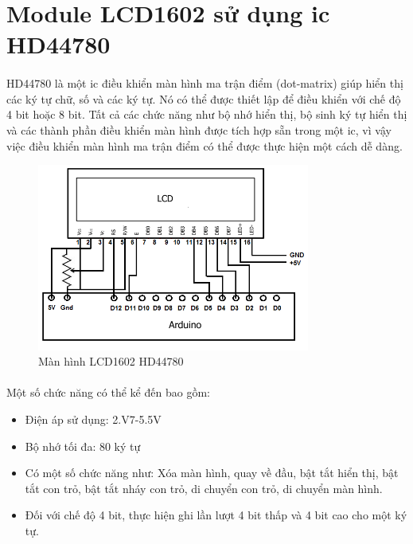 \section{Module LCD1602 sử dụng ic HD44780}
\paragraph{}
HD44780 là một ic điều khiển màn hình ma trận điểm (dot-matrix) giúp hiển thị các ký tự chữ, số và các ký tự. Nó có thể được thiết lập để điều khiển với chế độ 4 bit hoặc 8 bit. Tất cả các chức năng như bộ nhớ hiển thị, bộ sinh ký tự hiển thị và các thành phần điều khiển màn hình được tích hợp sẵn trong một ic, vì vậy việc điều khiển màn hình ma trận điểm có thể được thực hiện một cách dễ dàng.

\begin{figure}[H]
    \centering
    \includegraphics[width=0.8\textwidth]{images/Arduino-HD44780-circuit-schematic.png}
    \caption{Màn hình LCD1602 HD44780}
    \label{fig:hd44780}
\end{figure}
\paragraph{}
Một số chức năng có thể kể đến bao gồm:
\begin{itemize}
    \item Điện áp sử dụng: 2.V7-5.5V
    \item Bộ nhớ tối đa: 80 ký tự
    \item Có một số chức năng như: Xóa màn hình, quay về đầu, bật tắt hiển thị, bật tắt con trỏ, bật tắt nháy con trỏ, di chuyển con trỏ, di chuyển màn hình.   
    \item Đối với chế độ 4 bit, thực hiện ghi lần lượt 4 bit thấp và 4 bit cao cho một ký tự.
\end{itemize}

